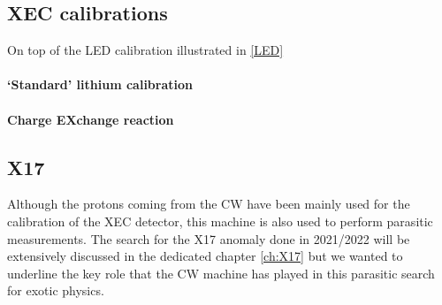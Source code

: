 \begin{refsection}
    \subsection{XEC calibrations}
        On top of the LED calibration illustrated in \ref{LED} 
        \paragraph{`Standard' lithium calibration}
        \paragraph{Charge EXchange reaction}

    \subsection{X17}
        Although the protons coming from the CW have been mainly used for the calibration of the XEC detector, this machine is also used to perform parasitic measurements.
        The search for the X17 anomaly done in 2021/2022 will be extensively discussed in the dedicated chapter \ref{ch:X17} but we wanted to underline the key role that the CW machine has played in this parasitic search for exotic physics. 


\end{refsection}

